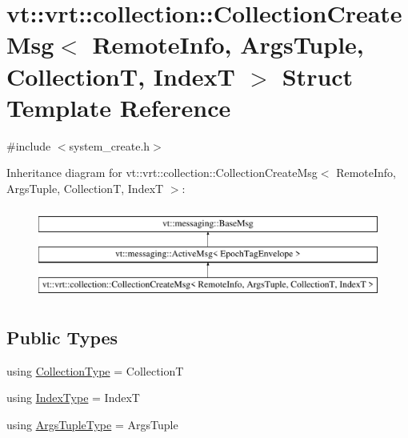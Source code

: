 \hypertarget{structvt_1_1vrt_1_1collection_1_1_collection_create_msg}{}\section{vt\+:\+:vrt\+:\+:collection\+:\+:Collection\+Create\+Msg$<$ Remote\+Info, Args\+Tuple, CollectionT, IndexT $>$ Struct Template Reference}
\label{structvt_1_1vrt_1_1collection_1_1_collection_create_msg}


{\ttfamily \#include $<$system\+\_\+create.\+h$>$}

Inheritance diagram for vt\+:\+:vrt\+:\+:collection\+:\+:Collection\+Create\+Msg$<$ Remote\+Info, Args\+Tuple, CollectionT, IndexT $>$\+:\begin{figure}[H]
\begin{center}
\leavevmode
\includegraphics[height=3.000000cm]{structvt_1_1vrt_1_1collection_1_1_collection_create_msg}
\end{center}
\end{figure}
\subsection*{Public Types}
\begin{DoxyCompactItemize}
\item 
using \hyperlink{structvt_1_1vrt_1_1collection_1_1_collection_create_msg_a32f39cc924fbbe6f445d48f5b74ded8f}{Collection\+Type} = CollectionT
\item 
using \hyperlink{structvt_1_1vrt_1_1collection_1_1_collection_create_msg_a32b4a63169ad3f9063002a91dadb2435}{Index\+Type} = IndexT
\item 
using \hyperlink{structvt_1_1vrt_1_1collection_1_1_collection_create_msg_abb55583fc386581742c169c93840744f}{Args\+Tuple\+Type} = Args\+Tuple
\end{DoxyCompactItemize}
